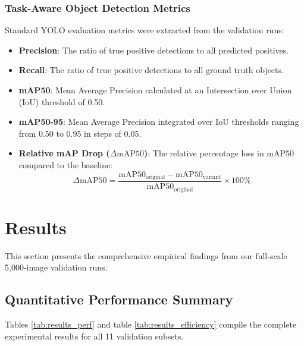 \documentclass[12pt, a4paper]{article}
\begin{document}
\subsubsection{Task-Aware Object Detection Metrics}
Standard YOLO evaluation metrics were extracted from the validation runs:
\begin{itemize}
    \item \textbf{Precision}: The ratio of true positive detections to all predicted positives.
    \item \textbf{Recall}: The ratio of true positive detections to all ground truth objects.
    \item \textbf{mAP50}: Mean Average Precision calculated at an Intersection over Union (IoU) threshold of 0.50.
    \item \textbf{mAP50-95}: Mean Average Precision integrated over IoU thresholds ranging from 0.50 to 0.95 in steps of 0.05.
    \item \textbf{Relative mAP Drop ($\Delta \text{mAP50}$)}: The relative percentage loss in mAP50 compared to the baseline:
    \begin{equation}
    \Delta \text{mAP50} = \frac{\text{mAP50}_{\text{original}} - \text{mAP50}_{\text{variant}}}{\text{mAP50}_{\text{original}}} \times 100\%
    \label{eq:map_drop}
    \end{equation}
\end{itemize}

\section{Results}
This section presents the comprehensive empirical findings from our full-scale 5,000-image validation runs.

\subsection{Quantitative Performance Summary}
Tables \ref{tab:results_perf} and table \ref{tab:results_efficiency} compile the complete experimental results for all 11 validation subsets. 
\end{document}
